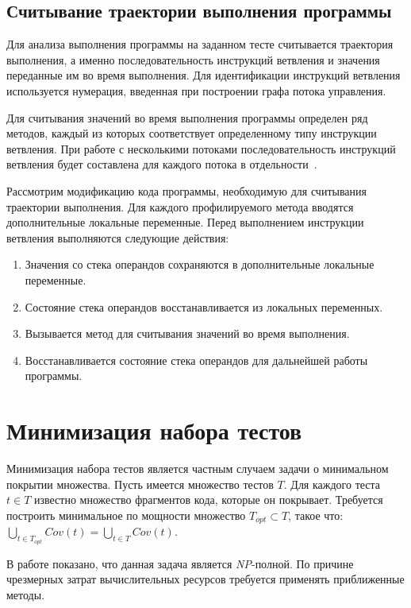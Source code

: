 \subsection{Считывание траектории выполнения программы}
Для анализа выполнения программы на заданном тесте считывается траектория выполнения, а именно последовательность инструкций ветвления и значения переданные им 
во время выполнения. Для идентификации инструкций ветвления используется нумерация, введенная при построении графа потока управления. 

Для считывания значений во время выполнения программы определен ряд методов, каждый из которых соответствует определенному типу инструкции ветвления. При работе 
с несколькими потоками последовательность инструкций ветвления будет составлена для каждого потока в отдельности~\cite{threadlocal}.

Рассмотрим модификацию кода программы, необходимую для считывания траектории выполнения. Для каждого профилируемого метода вводятся дополнительные локальные 
переменные. Перед выполнением инструкции ветвления выполняются следующие действия:
\begin{enumerate}
 \item Значения со стека операндов сохраняются в дополнительные локальные переменные.
 \item Состояние стека операндов восстанавливается из локальных переменных.
 \item Вызывается метод для считывания значений во время выполнения.
 \item Восстанавливается состояние стека операндов для дальнейшей работы программы.
\end{enumerate}

\section{Минимизация набора тестов}

Минимизация набора тестов является частным случаем задачи о минимальном покрытии множества. Пусть имеется множество тестов $T$. Для каждого теста $t \in T$ 
известно множество фрагментов кода, которые он покрывает. Требуется построить минимальное по мощности множество $T_{opt} \subset T$, такое что: 
$\bigcup\limits_{t \in T_{opt}}Cov(t) = \bigcup\limits_{t \in T}Cov(t)$.

В работе \cite{minimization} показано, что данная задача является \textit{NP}-полной. По причине чрезмерных затрат вычислительных ресурсов 
требуется применять приближенные методы.

